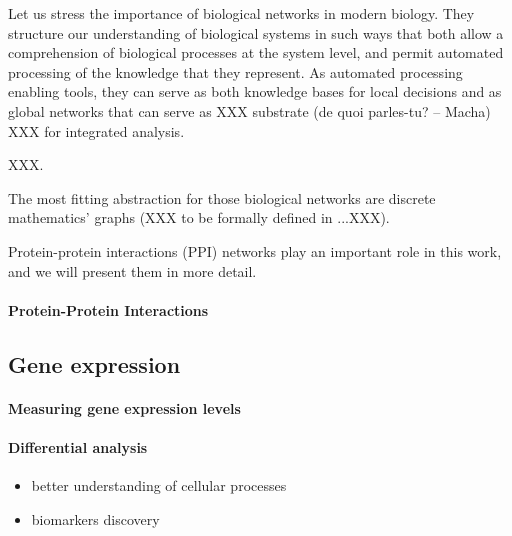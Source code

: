 			Let us stress the importance of biological networks in modern biology.
			They structure our understanding of biological systems in such ways that both allow a comprehension of biological processes at the system level, and permit automated processing of the knowledge that they represent.
			As automated processing enabling tools, they can serve as both knowledge bases for local decisions and as global networks that can serve as XXX substrate (de quoi parles-tu? -- Macha) XXX for integrated analysis.

			XXX.

			The most fitting abstraction for those biological networks are discrete mathematics' graphs (XXX to be formally defined in ...XXX).

			Protein-protein interactions (PPI) networks play an important role in this work, and we will present them in more detail.
	
			\paragraph{Protein-Protein Interactions}

		\subsection{Gene expression}

			\paragraph{Measuring gene expression levels}

			\paragraph{Differential analysis}

				\begin{itemize}
					\item better understanding of cellular processes
					\item biomarkers discovery
				\end{itemize}


